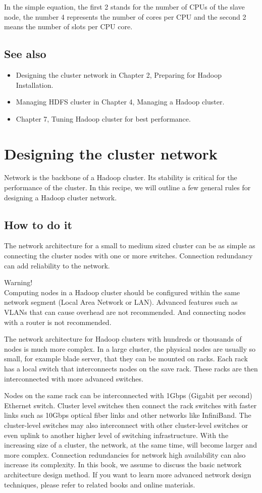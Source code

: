 In the simple equation, the first 2 stands for the number of CPUs of the slave node, the number 4 represents the number of cores per CPU and the second 2 means the number of slots per CPU core.
\subsection*{See also}
\begin{itemize}
  \item Designing the cluster network in Chapter 2, Preparing for Hadoop Installation.
  \item Managing HDFS cluster in Chapter 4, Managing a Hadoop cluster.
  \item Chapter 7, Tuning Hadoop cluster for best performance.
\end{itemize}

\section{Designing the cluster network}
Network is the backbone of a Hadoop cluster. Its stability is critical for the performance of the cluster. In this recipe, we will outline a few general rules for designing a Hadoop cluster network.
\subsection*{How to do it}
The network architecture for a small to medium sized cluster can be as simple as connecting the cluster nodes with one or more switches. Connection redundancy can add reliability to the network.

\begin{warning}
Warning! \\
Computing nodes in a Hadoop cluster should be configured within the same network segment (Local Area Network or LAN). Advanced features such as VLANs that can cause overhead are not recommended. And connecting nodes with a router is not recommended.
\end{warning}

The network architecture for Hadoop clusters with hundreds or thousands of nodes is much more complex. In a large cluster, the physical nodes are usually so small, for example blade server, that they can be mounted on racks. Each rack has a local switch that interconnects nodes on the save rack. These racks are then interconnected with more advanced switches.

Nodes on the same rack can be interconnected with 1Gbps (Gigabit per second) Ethernet switch. Cluster level switches then connect the rack switches with faster links such as 10Gbps optical fiber links and other networks like InfiniBand. The cluster-level switches may also interconnect with other cluster-level switches or even uplink to another higher level of switching infrastructure. With the increasing size of a cluster, the network, at the same time, will become larger and more complex. Connection redundancies for network high availability can also increase its complexity. In this book, we assume to discuss the basic network architecture design method. If you want to learn more advanced network design techniques, please refer to related books and online materials.

